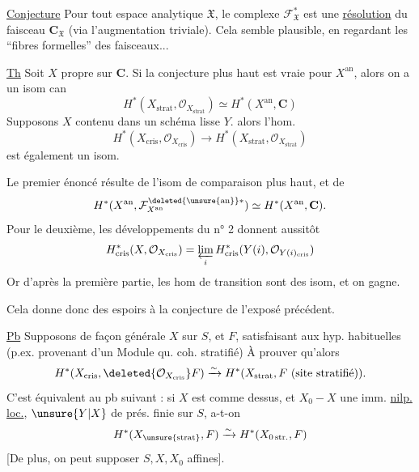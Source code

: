 \uline{Conjecture} Pour tout espace analytique $\mathfrak X$, le complexe $\mathcal F_{\mathfrak X}^*$ est une \uline{résolution} du faisceau $\mathbf C_{\mathfrak X}$ (via l'augmentation triviale).
\margin{[Alors pour $X$ prop, on a $H^*(\mathfrak X_{\mathrm{str}},\mathcal O_{\mathfrak X_{\mathrm{str}}})=H^*(\mathfrak X,\mathbf C)$]}
Cela semble plausible, en regardant les ``fibres formelles'' des faisceaux...

\uline{Th} Soit $X$ propre sur $\mathbf C$. Si la conjecture plus haut est vraie pour $X^{\mathrm{an}}$, alors on a un isom can
\[
H^*(X_{\mathrm{strat}},\mathcal O_{X_{\mathrm{strat}}})\simeq H^*(X^{\mathrm{an}},\mathbf C)
\]
Supposons $X$ contenu dans un schéma lisse $Y$.
 alors l'hom. 
\[
H^*(X_{\mathrm{cris}},\mathcal O_{X_{\mathrm{cris}}})\longrightarrow H^*(X_{\mathrm{strat}},\mathcal O_{X_{\mathrm{strat}}})
\]
est également un isom.

Le premier énoncé résulte de l'isom de comparaison plus haut, et de
\[
H^*(X^{\mathrm{an}},\mathcal F_{X^{\mathrm{an}}}^{\deleted{\unsure{\mathrm{an}}}*})\simeq H^*(X^{\mathrm{an}},\mathbf C).
\]
Pour le deuxième, les développements du n° 2 donnent aussitôt
\[
H^*_{\mathrm{cris}}(X,\mathcal O_{X_{\mathrm{cris}}})=\varprojlim_i H^*_{\mathrm{cris}}(Y(i),\mathcal O_{Y(i)_{\mathrm{cris}}})
\]
Or d'après la première partie, les hom de transition sont des isom, et on gagne.

Cela donne donc des espoirs à la conjecture de l'exposé précédent.

\uline{Pb} Supposons de façon générale $X$  sur $S$, et $F$, satisfaisant aux hyp. habituelles (p.ex. provenant d'un Module qu. coh. stratifié) À prouver qu'alors
\[
H^*(X_{\mathrm{cris}},\deleted{\mathcal O_{X_{\mathrm{cris}}}}F)\xrightarrow{\sim}H^*(X_{\mathrm{strat}},F\ (\text{site stratifié})).
\]
C'est  équivalent au pb suivant : si $X$ est comme dessus, et $X_0-X$ une imm. \uline{nilp. loc.}, $\unsure{Y|X}$ de prés. finie sur $S$, a-t-on
\[
H^*(X_{\unsure{\mathrm{strat}}},F)\xrightarrow{\sim}H^*(X_{0\,\mathrm{str.}},F)
\]
[De plus, on peut supposer $S,X,X_0$ affines].

